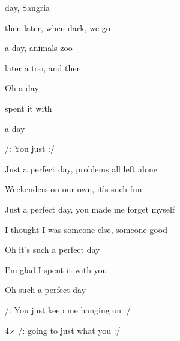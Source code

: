 



      

\zs

  day,
 Sangria 

 then later, when  dark,
we go 

 a  day,
 animals  zoo

 later a  too,
and then 

\bigskip

Oh  a  day

 spent it with 

 a  day

/: You just    :/
\ks


\zs
Just a perfect day,
problems all left alone

Weekenders on our own,
it's such fun

Just a perfect day,
you made me forget myself

I thought I was someone else,
someone good

\bigskip

Oh it's such a perfect day

I'm glad I spent it with you

Oh such a perfect day

/: You just keep me hanging on :/
\ks


4× /:
 going to  just what you   
:/


\kp


